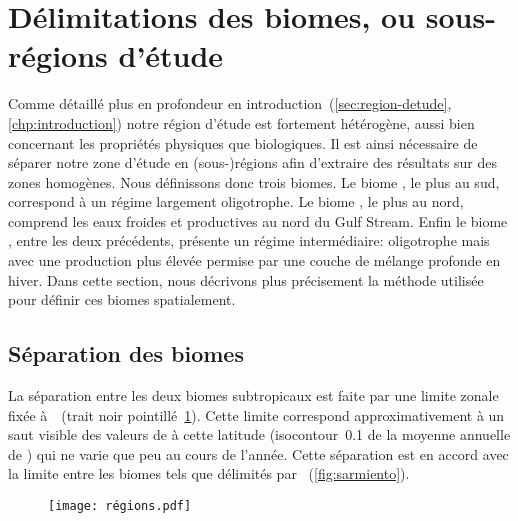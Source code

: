 \section{Délimitations des biomes, ou sous-régions d'étude}
\label{sec:delimitations-regions}

Comme détaillé plus en profondeur en introduction~(\cref{sec:region-detude}, \cref*{chp:introduction}) notre région d'étude est fortement hétérogène, aussi bien concernant les propriétés physiques que biologiques.
Il est ainsi nécessaire de séparer notre zone d'étude en (sous-)régions afin d'extraire des résultats sur des zones homogènes.
Nous définissons donc trois biomes.
Le biome , le plus au sud, correspond à un régime largement oligotrophe.
Le biome , le plus au nord, comprend les eaux froides et productives au nord du Gulf Stream.
Enfin le biome , entre les deux précédents, présente un régime intermédiaire: oligotrophe mais avec une production plus élevée permise par une couche de mélange profonde en hiver.
Dans cette section, nous décrivons plus précisement la méthode utilisée pour définir ces biomes spatialement.

\subsection{Séparation des biomes}

La séparation entre les deux biomes subtropicaux est faite par une limite zonale fixée à~~(trait noir pointillé~\cref{fig:regions}).
Cette limite correspond approximativement à un saut visible des valeurs de  à cette latitude (isocontour~\qty{0.1}{\mgm} de la moyenne annuelle de ) qui ne varie que peu au cours de l'année.
Cette séparation est en accord avec la limite entre les biomes tels que délimités par \textcite{sarmiento_2004}~(\cref{fig:sarmiento}).

\begin{figure}
  \centering
  \texttt{[image: régions.pdf]}
  \label{fig:regions}
\end{figure}

